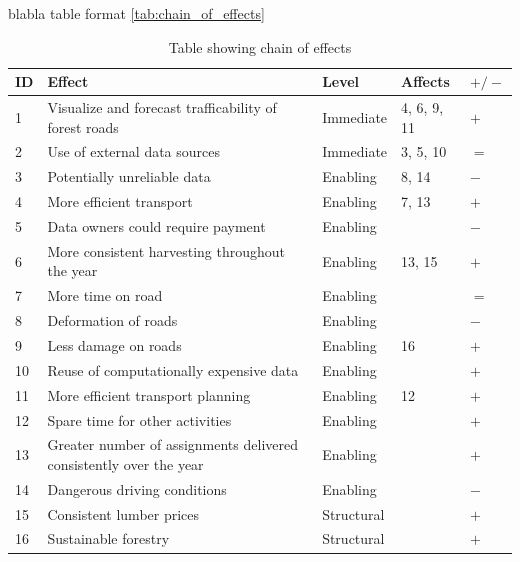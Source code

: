 blabla table format \autoref{tab:chain_of_effects}

\begin{table}[h]
    \centering
    \renewcommand{\arraystretch}{1}
    \begin{tabularx}{\textwidth}{|l|X|l|l|l|}
        \hline
        \rowcolor{gray!20}
        \textbf{ID} & \textbf{Effect} & \textbf{Level} & \textbf{Affects} & \textbf{$+/-$} \\ 
        \hline
         1 & Visualize and forecast trafficability of forest roads & Immediate & 4, 6, 9, 11 & $+$ \\
         \hline
         2 & Use of external data sources & Immediate & 3, 5, 10 & $=$ \\
         \hline
         3 & Potentially unreliable data & Enabling & 8, 14 & $-$ \\
         \hline
         4 & More efficient transport & Enabling & 7, 13 & $+$ \\
         \hline
         5 & Data owners could require payment & Enabling &  & $-$ \\
         \hline
         6 & More consistent harvesting throughout the year & Enabling & 13, 15 & $+$ \\
         \hline
         7 & More time on road & Enabling & & $=$ \\
         \hline
         8 & Deformation of roads & Enabling & & $-$ \\
         \hline
         9 & Less damage on roads & Enabling & 16 & $+$ \\
         \hline
         10 & Reuse of computationally expensive data & Enabling & & $+$ \\
         \hline
         11 & More efficient transport planning & Enabling & 12 & $+$ \\
         \hline
         12 & Spare time for other activities & Enabling & & $+$ \\
         \hline
         13 & Greater number of assignments delivered consistently over the year & Enabling & & $+$ \\
         \hline
         14 & Dangerous driving conditions & Enabling & & $-$ \\
         \hline
         15 & Consistent lumber prices & Structural & & $+$ \\
         \hline
         16 & Sustainable forestry & Structural & & $+$ \\
         \hline
    \end{tabularx}
    \caption{Table showing chain of effects}
    \label{tab:chain_of_effects}
\end{table}

